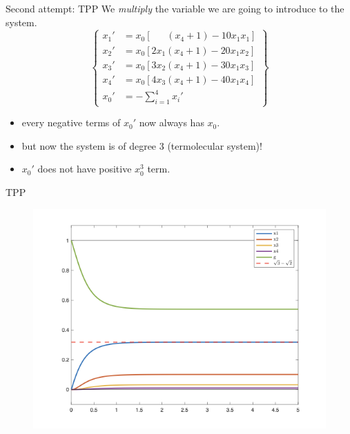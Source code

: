 \documentclass[aspectratio=169]{beamer}
\begin{document}
\begin{frame}[Clean]{Second attempt: TPP}
    We \emph{multiply} the variable we are going to introduce to the system.
    \[
        \left\{\begin{aligned}
x_1' &=   x_0\left[\;\;\;\;\;\,(x_4+1) - 10 x_1x_1\right]
\\
x_2'&=  x_0\left[2x_1 ( x_4 + 1) -20x_1x_2\right]
\\
x_3 ' &=  x_0\left[3x_2 ( x_4 + 1) -30x_1x_3\right]
\\
x_4'  &=  x_0\left[4x_3 ( x_4 + 1) -40x_1x_4\right]
\\
x_0'    &= -\sum\limits_{i=1}^4
x_i'\end{aligned}\right\}
    \]
\begin{itemize}
    \item every negative terms of $x_0'$ now always has $x_0$.
    \item but now the system is of degree 3 (termolecular system)!
    \item $x_0'$ does not have positive $x_0^3$ term.
\end{itemize}
\end{frame}
\begin{frame}{TPP}
    \begin{figure}[tb]
        \centering
        \includegraphics[scale=0.45]{tpp}
    \end{figure}
\end{frame}
\end{document}
